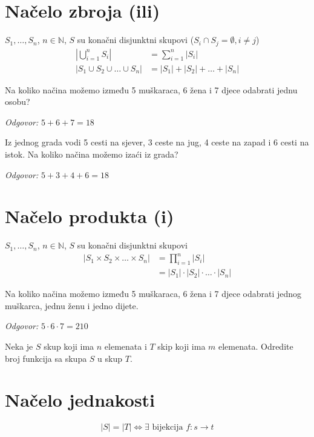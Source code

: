 \section{Načelo zbroja (ili)}
$S_1, \dots, S_n$, $n \in \mathbb{N}$, $S$ su konačni disjunktni skupovi ($S_i
\cap S_j = \emptyset, i\neq j$)
\begin{align}
    \left|\bigcup_{i=1}^nS_i\right| &= \sum_{i=1}^{n}|S_i| \\
    |S_1 \cup S_2 \cup \dots \cup S_n| &= |S_1| + |S_2| + \dots + |S_n|\nonumber
\end{align}

\begin{example}
    Na koliko načina možemo između 5 muškaraca, 6 žena i 7 djece odabrati
    jednu osobu?
\end{example}

\textit{Odgovor:} $5+6+7 = 18$

\begin{example}
    Iz jednog grada vodi 5 cesti na sjever, 3 ceste na jug, 4 ceste na
    zapad i 6 cesti na istok. Na koliko načina možemo izaći iz grada?
\end{example}

\textit{Odgovor:} $5+3+4+6 = 18$

\section{Načelo produkta (i)}
$S_1, \dots, S_n$, $n \in \mathbb{N}$, $S$ su konačni disjunktni skupovi
\begin{align}
    |S_1 \times S_2 \times \dots \times S_n| &= \prod_{i=1}^{n}|S_i| \\
    &= |S_1| \cdot |S_2| \cdot \ldots \cdot |S_n|\nonumber
\end{align}

\begin{example}
    Na koliko načina možemo između 5 muškaraca, 6 žena i 7 djece odabrati jednog
    muškarca, jednu ženu i jedno dijete.
\end{example}

\textit{Odgovor:} $5\cdot 6\cdot 7 = 210$

\begin{example}
    Neka je $S$ skup koji ima $n$ elemenata i $T$ skip koji ima $m$ elemenata.
    Odredite broj funkcija sa skupa $S$ u skup $T$.
\end{example}

\section{Načelo jednakosti}
$$
    |S| = |T| \iff \exists \text{ bijekcija } f: s \to t
$$

